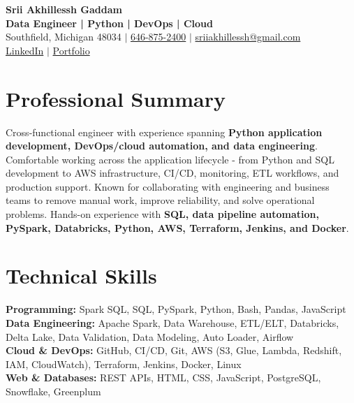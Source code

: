 \documentclass[letterpaper,10pt]{article}
\begin{document}
\fontsize{9.35pt}{10.45pt}\selectfont

\begin{center}
    {\LARGE \textbf{Srii Akhillessh Gaddam}} \\[-1pt]
    \textbf{Data Engineer | Python | DevOps | Cloud} \\[2pt]
    Southfield, Michigan 48034 $|$
    \href{tel:6468752400}{646-875-2400} $|$
    \href{mailto:sriiakhillessh@gmail.com}{sriiakhillessh@gmail.com} \\[1pt]
    \href{https://www.linkedin.com/in/srii-akhiilessh-gaddam-b48668191/}{LinkedIn} $|$
    \href{https://sriiakhillesshg.github.io/portfolio/}{Portfolio}
\end{center}
\vspace{-8pt}

\section{Professional Summary}
\small{Cross-functional engineer with experience spanning \textbf{Python application development, DevOps/cloud automation, and data engineering}. Comfortable working across the application lifecycle - from Python and SQL development to AWS infrastructure, CI/CD, monitoring, ETL workflows, and production support. Known for collaborating with engineering and business teams to remove manual work, improve reliability, and solve operational problems. Hands-on experience with \textbf{SQL, data pipeline automation, PySpark, Databricks, Python, AWS, Terraform, Jenkins, and Docker}.}

\section{Technical Skills}
\small{
\textbf{Programming:} Spark SQL, SQL, PySpark, Python, Bash, Pandas, JavaScript \\
\textbf{Data Engineering:} Apache Spark, Data Warehouse, ETL/ELT, Databricks, Delta Lake, Data Validation, Data Modeling, Auto Loader, Airflow \\
\textbf{Cloud \& DevOps:} GitHub, CI/CD, Git, AWS (S3, Glue, Lambda, Redshift, IAM, CloudWatch), Terraform, Jenkins, Docker, Linux \\
\textbf{Web \& Databases:} REST APIs, HTML, CSS, JavaScript, PostgreSQL, Snowflake, Greenplum
}
\end{document}
